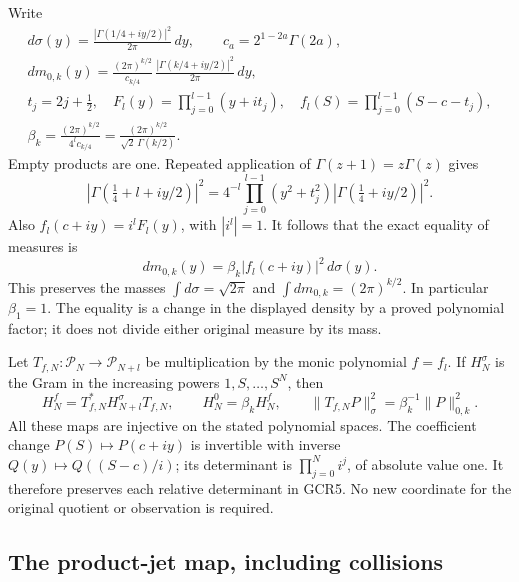 \documentclass[11pt,a4paper]{article}
\begin{document}
Write
\[
\begin{gathered}
 d\sigma(y)=\frac{|\Gamma(1/4+iy/2)|^2}{2\pi}\,dy,\qquad
 c_a=2^{1-2a}\Gamma(2a),\\
 dm_{0,k}(y)=\frac{(2\pi)^{k/2}}{c_{k/4}}\,
                \frac{|\Gamma(k/4+iy/2)|^2}{2\pi}\,dy,\\
 t_j=2j+\tfrac12,\quad
 F_l(y)=\prod_{j=0}^{l-1}(y+it_j),\quad
 f_l(S)=\prod_{j=0}^{l-1}(S-c-t_j),\\
 \beta_k=\frac{(2\pi)^{k/2}}{4^l c_{k/4}}
         =\frac{(2\pi)^{k/2}}{\sqrt2\,\Gamma(k/2)}.
\end{gathered}\tag{GCR3}
\]
Empty products are one. Repeated application of
$\Gamma(z+1)=z\Gamma(z)$ gives
\[
 \left|\Gamma(\tfrac14+l+iy/2)\right|^2
 =4^{-l}\prod_{j=0}^{l-1}(y^2+t_j^2)
                      |\Gamma(\tfrac14+iy/2)|^2.
\]
Also $f_l(c+iy)=i^lF_l(y)$, with $|i^l|=1$.
It follows that the exact equality of measures is
\[
 \boxed{\quad dm_{0,k}(y)=\beta_k
                 |f_l(c+iy)|^2\,d\sigma(y).\quad}
\tag{GCR4}
\]
This preserves the masses
$\int d\sigma=\sqrt{2\pi}$ and
$\int dm_{0,k}=(2\pi)^{k/2}$. In particular $\beta_1=1$.
The equality is a change in the displayed density by a proved
polynomial factor; it does not divide either original measure
by its mass.

Let $T_{f,N}:\mathcal P_N\to\mathcal P_{N+l}$ be multiplication
by the monic polynomial $f=f_l$. If $H^\sigma_N$ is the Gram
in the increasing powers $1,S,\ldots,S^N$, then
\[
 H^f_N=T_{f,N}^*H^\sigma_{N+l}T_{f,N},\qquad
 H^0_N=\beta_k H^f_N,\qquad
 \|T_{f,N}P\|_\sigma^2=\beta_k^{-1}\|P\|_{0,k}^2.
\tag{GCR5}
\]
All these maps are injective on the stated polynomial spaces.
The coefficient change $P(S)\mapsto P(c+iy)$ is invertible with
inverse $Q(y)\mapsto Q((S-c)/i)$; its determinant is
$\prod_{j=0}^N i^j$, of absolute value one. It therefore preserves
each relative determinant in GCR5. No new coordinate for the
original quotient or observation is required.

\subsection{The product-jet map, including collisions}
\end{document}
